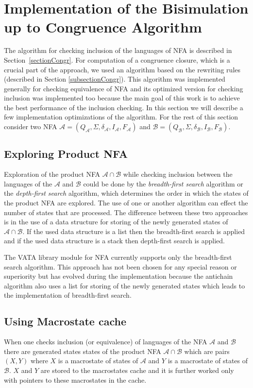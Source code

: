 \section{Implementation of the Bisimulation up to Congruence Algorithm}
\label{sectionCongrImpl}
The algorithm for checking inclusion of the languages of NFA is described in Section~\ref{sectionCongr}. For computation of a congruence closure, 
which is a crucial part of the approach, we used an algorithm based on the rewriting rules (described in Section \ref{subsectionCongr}). 
This algorithm was implemented generally for checking equivalence of NFA and its optimized version for checking inclusion was implemented too 
because the main goal of this work is to achieve the best performance of the inclusion checking. In this section we will describe a few implementation
optimizations of the algorithm. 
For the rest of this section consider two NFA $\mathcal{A}=(Q_\mathcal{A},\Sigma,\delta_\mathcal{A},I_\mathcal{A},F_\mathcal{A})$ and
$\mathcal{B}=(Q_\mathcal{B},\Sigma,\delta_\mathcal{B},I_\mathcal{B},F_\mathcal{B})$.


\subsection{Exploring Product NFA}
Exploration of the product NFA $\mathcal{A}\cap\mathcal{B}$ while checking inclusion between the languages of the 
$\mathcal{A}$ and $\mathcal{B}$ could be done by 
the \emph{breadth-first search} \cite{taocp} algorithm or the \emph{depth-first search} \cite{taocp} algorithm, which
determines the order in which the states of the product NFA are explored. The use of one or another algorithm can effect the number of states that are processed. 
The difference between these two approaches is in the use of a data structure for storing of the newly generated states of $\mathcal{A}\cap\mathcal{B}$.
If the used data structure is a list then the breadth-first search is applied and if the used data structure is a stack then 
depth-first search is applied.

The VATA library module for NFA currently supports only the breadth-first search algorithm. This approach has not been chosen for any special reason or superiority
but has evolved during the implementation because the antichain algorithm also uses a list for storing of 
the newly generated states which leads to the implementation of breadth-first search.


\subsection{Using Macrostate cache}
When one checks inclusion (or equivalence) of languages of the NFA $\mathcal{A}$ and $\mathcal{B}$ there are generated states states of the 
product NFA $\mathcal{A}
\cap \mathcal{B}$ which are pairs $(X,Y)$ where $X$ is a macrostate of states of $\mathcal{A}$ and $Y$ is a macrostate of states of $\mathcal{B}$. $X$ and $Y$
are stored to the macrostates cache and it is further worked only with pointers to these macrostates in the cache.

